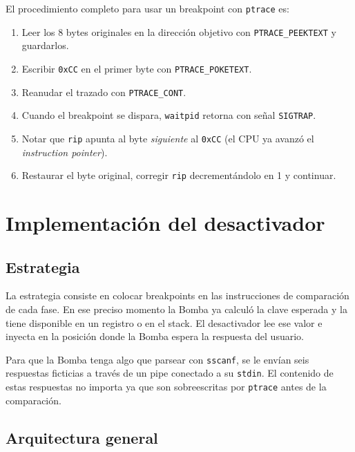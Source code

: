 \documentclass[10pt,a4paper]{article}
\begin{document}
El procedimiento completo para usar un breakpoint con \texttt{ptrace} es:
\begin{enumerate}[label=\arabic*.]
    \item Leer los 8 bytes originales en la dirección objetivo con \texttt{PTRACE\_PEEKTEXT} y guardarlos.
    \item Escribir \texttt{0xCC} en el primer byte con \texttt{PTRACE\_POKETEXT}.
    \item Reanudar el trazado con \texttt{PTRACE\_CONT}.
    \item Cuando el breakpoint se dispara, \texttt{waitpid} retorna con señal \texttt{SIGTRAP}.
    \item Notar que \texttt{rip} apunta al byte \emph{siguiente} al \texttt{0xCC} (el CPU ya avanzó el \textit{instruction pointer}).
    \item Restaurar el byte original, corregir \texttt{rip} decrementándolo en 1 y continuar.
\end{enumerate}

\section{Implementación del desactivador}

\subsection{Estrategia}

La estrategia consiste en colocar breakpoints en las instrucciones de comparación de cada fase. En ese preciso momento la Bomba ya calculó la clave esperada y la tiene disponible en un registro o en el stack. El desactivador lee ese valor e inyecta en la posición donde la Bomba espera la respuesta del usuario.

Para que la Bomba tenga algo que parsear con \texttt{sscanf}, se le envían seis respuestas ficticias a través de un pipe conectado a su \texttt{stdin}. El contenido de estas respuestas no importa ya que son sobreescritas por \texttt{ptrace} antes de la comparación.

\subsection{Arquitectura general}
\end{document}
